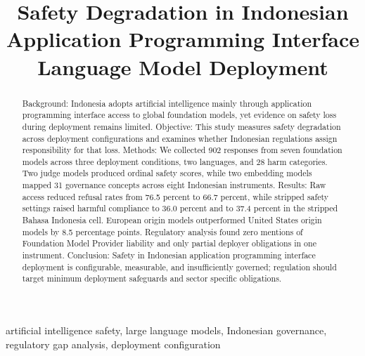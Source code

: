 \documentclass[conference]{IEEEtran}
\begin{document}
\title{Safety Degradation in Indonesian Application Programming Interface Language Model Deployment}

\author{
}

\maketitle

\begin{abstract}
Background: Indonesia adopts artificial intelligence mainly through application programming interface access to global foundation models, yet evidence on safety loss during deployment remains limited. Objective: This study measures safety degradation across deployment configurations and examines whether Indonesian regulations assign responsibility for that loss. Methods: We collected 902 responses from seven foundation models across three deployment conditions, two languages, and 28 harm categories. Two judge models produced ordinal safety scores, while two embedding models mapped 31 governance concepts across eight Indonesian instruments. Results: Raw access reduced refusal rates from 76.5 percent to 66.7 percent, while stripped safety settings raised harmful compliance to 36.0 percent and to 37.4 percent in the stripped Bahasa Indonesia cell. European origin models outperformed United States origin models by 8.5 percentage points. Regulatory analysis found zero mentions of Foundation Model Provider liability and only partial deployer obligations in one instrument. Conclusion: Safety in Indonesian application programming interface deployment is configurable, measurable, and insufficiently governed; regulation should target minimum deployment safeguards and sector specific obligations.
\end{abstract}

\begin{IEEEkeywords}
artificial intelligence safety, large language models, Indonesian governance, regulatory gap analysis, deployment configuration
\end{IEEEkeywords}
\end{document}
